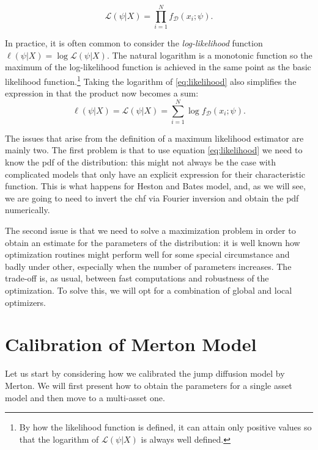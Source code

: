 \begin{equation}
\label{eq:log_likelihood}
\mathcal{L}(\psi |  X) = \prod_{i=1}^{N} f_{ \mathcal{D}}(x_{i}; \psi).
\end{equation}

In practice, it is often common to consider the \textit{log-likelihood} function $\ell(\psi |  X)  = \log \mathcal{L}(\psi |  X)$. The natural logarithm is a monotonic function so the maximum of the log-likelihood function is achieved in the same point as the basic likelihood function.\footnote{By how the likelihood function is defined, it can attain only positive values so that the logarithm of  $\mathcal{L}(\psi |  X)$ is always well defined.}
Taking the logarithm of \eqref{eq:likelihood} also simplifies the expression in that the product now becomes a sum:
\begin{equation}
\label{eq:likelihood}
\ell (\psi |  X) =\mathcal{L}(\psi |  X) = \sum_{i=1}^{N} \log f_{ \mathcal{D}}(x_{i}; \psi).
\end{equation}

The issues that arise from the definition of a maximum likelihood estimator are mainly two.
The first problem is that to use equation \eqref{eq:likelihood} we need to know the pdf of the distribution: this might not always be the case with complicated models that only have an explicit expression for their characteristic function. This is what happens for Heston and Bates model, and, as we will see, we are going to need to invert the chf via Fourier inversion and obtain the pdf numerically.

The second issue is that we need to solve a maximization problem in order to obtain an estimate for the parameters of the distribution: it is well known how optimization routines might perform well for some special circumstance and badly under other, especially when the number of parameters increases. The trade-off is, as usual, between fast computations and robustness of the optimization. To solve this, we will opt for a combination of global and local optimizers.





\section{Calibration of Merton Model}
Let us start by considering how we calibrated the jump diffusion model by Merton. 
We will first present how to obtain the parameters for a single asset model and then move to a multi-asset one.



